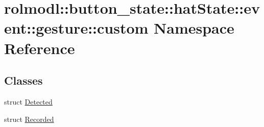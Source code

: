 \hypertarget{namespacerolmodl_1_1button__state_1_1hat_state_1_1event_1_1gesture_1_1custom}{}\section{rolmodl\+::button\+\_\+state\+::hat\+State\+::event\+::gesture\+::custom Namespace Reference}
\label{namespacerolmodl_1_1button__state_1_1hat_state_1_1event_1_1gesture_1_1custom}
\subsection*{Classes}
\begin{DoxyCompactItemize}
\item 
struct \mbox{\hyperlink{structrolmodl_1_1button__state_1_1hat_state_1_1event_1_1gesture_1_1custom_1_1_detected}{Detected}}
\item 
struct \mbox{\hyperlink{structrolmodl_1_1button__state_1_1hat_state_1_1event_1_1gesture_1_1custom_1_1_recorded}{Recorded}}
\end{DoxyCompactItemize}
